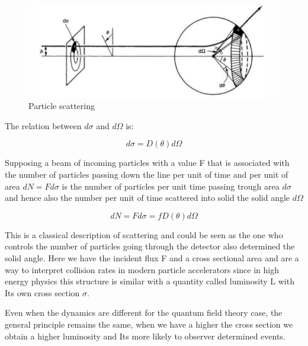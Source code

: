 \begin{figure}[h]
    \centering
   \includegraphics[width=1\textwidth]{cross1.png}
    \caption{Particle scattering}
    \label{fig:cross}
\end{figure}

The relation between $d\sigma$ and $d\Omega$ is:

\begin{equation}
d\sigma = D(\theta)d\Omega
\end{equation}

Supposing a beam of incoming particles with a value F that is associated with the number of particles passing down the line per unit of time and per unit of area $dN = F d\sigma $ is the number of particles per unit time passing trough area $d\sigma$ and hence also the number per unit of time scattered into solid the solid angle $d\Omega$

\begin{equation}
dN = F d\sigma = fD(\theta) d\Omega 
\end{equation}

This is a classical description of scattering and could be seen as the one who controls the number of particles going through the detector also determined the solid angle. Here we have the incident flux F and a cross sectional area and are a way to interpret collision rates in modern particle accelerators since in high energy physics this structure is similar with a quantity called luminosity L with Its own cross section $\sigma$. 

Even when the dynamics are different for the quantum field theory case, the general principle remains the same, when we have a  higher the cross section we obtain a higher luminosity and Its more likely to observer determined events. 


